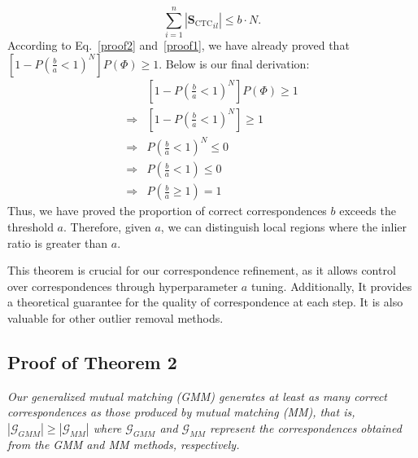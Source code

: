 \begin{equation}
    \sum_{i=1}^{n} |{\mathbf{S}_{\mathrm{CTC}}}_{il}| \leqslant b \cdot N.
    \label{proof2}
\end{equation}
According to Eq.~\ref{proof2} and~\ref{proof1}, we have already proved that $\left[1- P(\frac{b   }{a}< 1)^N \right]P(\Phi) \geqslant 1$.
Below is our final derivation:
\begin{equation}
\begin{aligned} 
    &\left[1- P(\frac{b   }{a}< 1)^N \right]P(\Phi) \geqslant 1 \\
    \Rightarrow & \left[1- P(\frac{b   }{a}< 1)^N \right] \geqslant 1 \\
    \Rightarrow & P(\frac{b   }{a}< 1)^N \leqslant 0 \\
    \Rightarrow & P(\frac{b   }{a}< 1) \leqslant 0 \\
    \Rightarrow & P(\frac{b   }{a}\geqslant  1) =  1
\end{aligned} 
\end{equation}
Thus, we have proved the proportion of correct correspondences 
$b$ exceeds the threshold $a$.
Therefore, given $a$, we can distinguish local regions where the inlier ratio is greater than $a$.

This theorem is crucial for our correspondence refinement, as it allows control over correspondences through hyperparameter $a$ tuning. Additionally, It provides a theoretical guarantee for the quality of correspondence at each step. It is also valuable for other outlier removal methods.

\subsection{Proof of Theorem 2}
\emph{
Our generalized mutual matching (GMM) generates at least as many correct correspondences as those produced by mutual matching (MM), that is, $|\mathcal{{G}}_{GMM}|\geqslant |\mathcal{{G}}_{MM}|$ where 
$\mathcal{{G}}_{GMM}$ and $\mathcal{{G}}_{MM}$ represent the correspondences obtained from the GMM and MM methods, respectively.  
}

